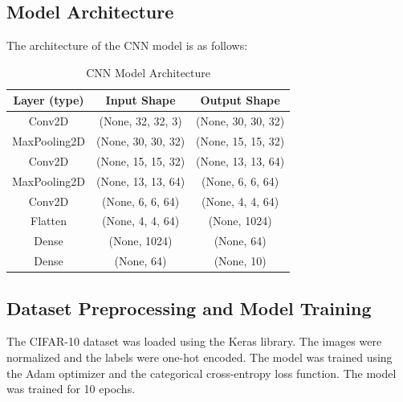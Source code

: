 \documentclass[12pt]{article}
\begin{document}
\subsection{Model Architecture}
The architecture of the CNN model is as follows:
\begin{table}[H]
    \centering
    \begin{tabular}{c|c|c}
        \hline
        Layer (type) & Input Shape & Output Shape \\
        \hline
        Conv2D & (None, 32, 32, 3) & (None, 30, 30, 32) \\
        MaxPooling2D & (None, 30, 30, 32) & (None, 15, 15, 32) \\
        Conv2D & (None, 15, 15, 32) & (None, 13, 13, 64) \\
        MaxPooling2D & (None, 13, 13, 64) & (None, 6, 6, 64) \\
        Conv2D & (None, 6, 6, 64) & (None, 4, 4, 64) \\
        Flatten & (None, 4, 4, 64) & (None, 1024) \\
        Dense & (None, 1024) & (None, 64) \\
        Dense & (None, 64) & (None, 10) \\
        \hline
    \end{tabular}
    \caption{CNN Model Architecture}
\end{table}
\subsection{Dataset Preprocessing and Model Training}
The CIFAR-10 dataset was loaded using the Keras library. 
The images were normalized and the labels were one-hot encoded.
The model was trained using the Adam optimizer and the categorical cross-entropy loss function. 
The model was trained for 10 epochs.
\end{document}
